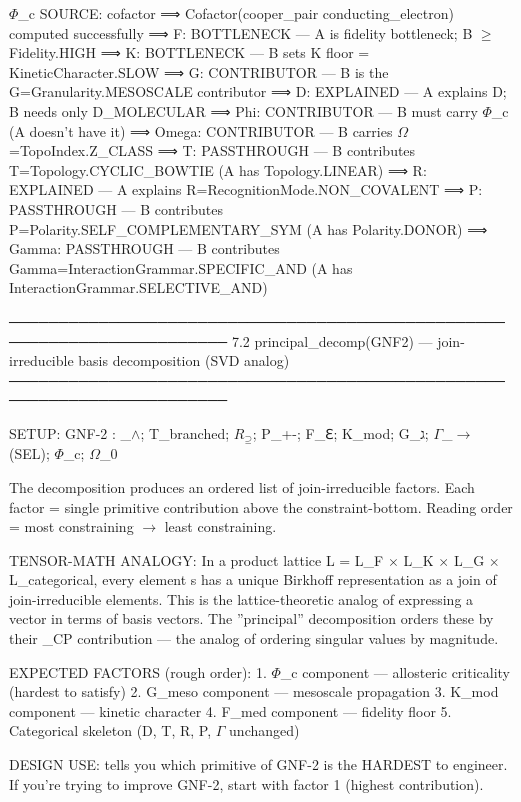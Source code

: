 \documentclass[12pt,a4paper]{article}
\begin{document}
$\Phi$\_c SOURCE: cofactor
⟹  Cofactor(cooper\_pair \textbar{} conducting\_electron) computed successfully
⟹    F: BOTTLENECK --- A is fidelity bottleneck; B $\geq$ Fidelity.HIGH
⟹    K: BOTTLENECK --- B sets K floor = KineticCharacter.SLOW
⟹    G: CONTRIBUTOR --- B is the G=Granularity.MESOSCALE contributor
⟹    D: EXPLAINED --- A explains D; B needs only D\_MOLECULAR
⟹    Phi: CONTRIBUTOR --- B must carry $\Phi$\_c (A doesn't have it)
⟹    Omega: CONTRIBUTOR --- B carries $\Omega$=TopoIndex.Z\_CLASS
⟹    T: PASSTHROUGH --- B contributes T=Topology.CYCLIC\_BOWTIE (A has Topology.LINEAR)
⟹    R: EXPLAINED --- A explains R=RecognitionMode.NON\_COVALENT
⟹    P: PASSTHROUGH --- B contributes P=Polarity.SELF\_COMPLEMENTARY\_SYM (A has Polarity.DONOR)
⟹    Gamma: PASSTHROUGH --- B contributes Gamma=InteractionGrammar.SPECIFIC\_AND (A has InteractionGrammar.SELECTIVE\_AND)

────────────────────────────────────────────────────────────────────────
7.2  principal\_decomp(GNF2) --- join-irreducible basis decomposition (SVD analog)
────────────────────────────────────────────────────────────────────────

SETUP:
GNF-2 : \langleD\_$\land$; T\_branched; $R_{\supseteq}$; P\_+-; F\_ℇ; K\_mod; G\_ג; $\Gamma$\_$\rightarrow$(SEL); $\Phi$\_c; $\Omega$\_0\rangle

The decomposition produces an ordered list of join-irreducible factors.
Each factor = single primitive contribution above the constraint-bottom.
Reading order = most constraining $\rightarrow$ least constraining.

TENSOR-MATH ANALOGY:
In a product lattice L = L\_F $\times$ L\_K $\times$ L\_G $\times$ L\_categorical,
every element s has a unique Birkhoff representation as a join
of join-irreducible elements. This is the lattice-theoretic analog
of expressing a vector in terms of basis vectors.
The ''principal'' decomposition orders these by their \xi\_CP contribution ---
the analog of ordering singular values by magnitude.

EXPECTED FACTORS (rough order):
1. $\Phi$\_c component   --- allosteric criticality (hardest to satisfy)
2. G\_meso component --- mesoscale propagation
3. K\_mod component  --- kinetic character
4. F\_med component  --- fidelity floor
5. Categorical skeleton (D, T, R, P, $\Gamma$ unchanged)

DESIGN USE: tells you which primitive of GNF-2 is the HARDEST to engineer.
If you're trying to improve GNF-2, start with factor 1 (highest \xi contribution).
\end{document}
